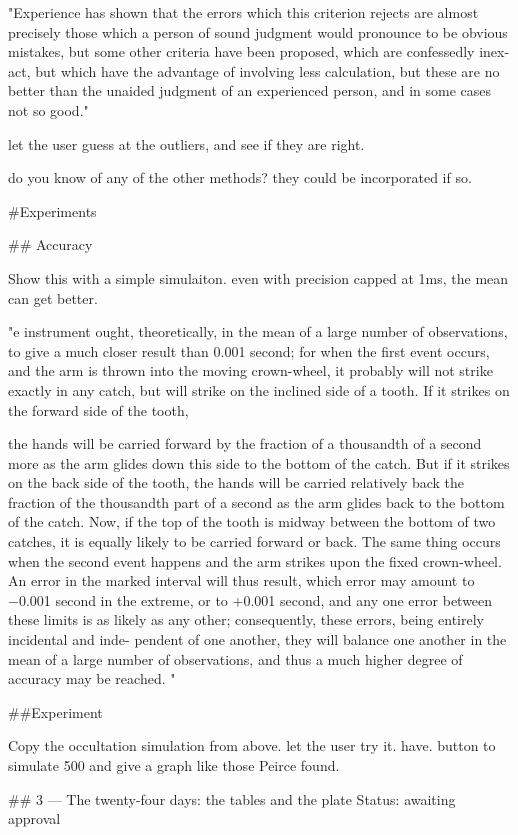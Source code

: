  "Experience has shown that the errors which this criterion rejects are almost precisely those which a person of sound judgment would pronounce to be obvious mistakes, but some other criteria have been proposed, which are confessedly inex- act, but which have the advantage of involving less calculation, but these are no better than the unaided judgment of an experienced person, and in some cases not so good."
 
 let the user guess at the outliers, and see if they are right. 
 
 do you know of any of the other methods? they could be incorporated if so. 


#Experiments

## Accuracy

Show this with a simple simulaiton. even with precision capped at 1ms, the mean can get better. 

"e instrument ought, theoretically, in the mean of a large number of observations, to give a much closer result than 0.001 second; for when the first event occurs, and the arm is thrown into the moving crown-wheel, it probably will not strike exactly in any catch, but will strike on the inclined side of a tooth. If it strikes on the forward side of the tooth,

the hands will be carried forward by the fraction of a thousandth of a second more as the arm glides down this side to the bottom of the catch. But if it strikes on the back side of the tooth, the hands will be carried relatively back the fraction of the thousandth part of a second as the arm glides back to the bottom of the catch. Now, if the top of the tooth is midway between the bottom of two catches, it is equally likely to be carried forward or back. The same thing occurs when the second event happens and the arm strikes upon the fixed crown-wheel. An error in the marked interval will thus result, which error may amount to −0.001 second in the extreme, or to +0.001 second, and any one error between these limits is as likely as any other; consequently, these errors, being entirely incidental and inde- pendent of one another, they will balance one another in the mean of a large number of observations, and thus a much higher degree of accuracy may be reached. "

##Experiment

Copy the occultation simulation from above. let the user try it. have. button to simulate 500 and give a graph like those Peirce found. 

## 3 — The twenty-four days: the tables and the plate
Status: awaiting approval

